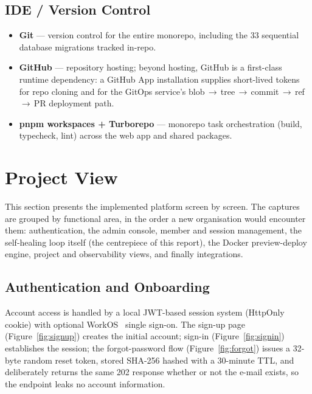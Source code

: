\subsection{IDE / Version Control}

\begin{itemize}[itemsep=2pt]
  \item \textbf{Git} --- version control for the entire monorepo, including
        the 33 sequential database migrations tracked in-repo.
  \item \textbf{GitHub} --- repository hosting; beyond hosting, GitHub is a
        first-class runtime dependency: a GitHub App installation supplies
        short-lived tokens for repo cloning and for the GitOps service's
        blob\,$\rightarrow$\,tree\,$\rightarrow$\,commit\,$\rightarrow$\,ref\,$\rightarrow$\,PR
        deployment path.
  \item \textbf{pnpm workspaces + Turborepo} --- monorepo task orchestration
        (build, typecheck, lint) across the web app and shared packages.
\end{itemize}

\section{Project View}
\label{sec:projectview}

This section presents the implemented platform screen by screen. The captures
are grouped by functional area, in the order a new organisation would
encounter them: authentication, the admin console, member and session
management, the self-healing loop itself (the centrepiece of this report),
the Docker preview-deploy engine, project and observability views, and
finally integrations.

\subsection{Authentication and Onboarding}

Account access is handled by a local JWT-based session system (HttpOnly
cookie) with optional WorkOS~\cite{workos} single sign-on. The sign-up page
(Figure~\ref{fig:signup}) creates the initial account; sign-in
(Figure~\ref{fig:signin}) establishes the session; the forgot-password flow
(Figure~\ref{fig:forgot}) issues a 32-byte random reset token, stored SHA-256
hashed with a 30-minute TTL, and deliberately returns the same 202 response
whether or not the e-mail exists, so the endpoint leaks no account
information.

